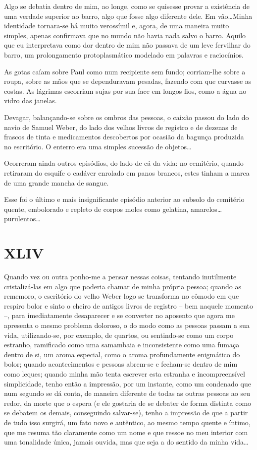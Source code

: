 Algo se debatia dentro de mim, ao longe, como se quisesse provar a existência de uma verdade superior ao barro, algo que fosse algo diferente dele. Em vão\dots Minha identidade tornara-se há muito verossímil e, agora, de uma maneira muito simples, apenas confirmava que no mundo não havia nada salvo o barro. Aquilo que eu interpretava como dor dentro de mim não passava de um leve fervilhar do barro, um prolongamento protoplasmático modelado em palavras e raciocínios.

As gotas caíam sobre Paul como num recipiente sem fundo; corriam-lhe sobre a roupa, sobre as mãos que se dependuravam pesadas, fazendo com que curvasse as costas. As lágrimas escorriam sujas por sua face em longos fios, como a água no vidro das janelas.

Devagar, balançando-se sobre os ombros das pessoas, o caixão passou do lado do navio de Samuel Weber, do lado dos velhos livros de registro e de dezenas de frascos de tinta e medicamentos descobertos por ocasião da bagunça produzida no escritório. O enterro era uma simples sucessão de objetos\dots

Ocorreram ainda outros episódios, do lado de cá da vida: no cemitério, quando retiraram do esquife o cadáver enrolado em panos brancos,  estes tinham a marca de uma grande mancha de sangue.

Esse foi o último e mais insignificante episódio anterior ao subsolo do cemitério quente, embolorado e repleto de corpos moles como gelatina, amarelos\dots purulentos\dots


\chapter*{\centering\Large{XLIV}}

Quando vez ou outra ponho-me a pensar nessas coisas, tentando inutilmente cristalizá-las em algo que poderia chamar de minha própria pessoa; quando as rememoro, o escritório do velho Weber logo se transforma no cômodo em que respiro bolor e sinto o cheiro de antigos livros de registro -- bem naquele momento --, para imediatamente desaparecer e se converter no aposento que agora me apresenta o mesmo problema doloroso, o do modo como as pessoas passam a sua vida, utilizando-se, por exemplo, de quartos, ou sentindo-se como um corpo estranho, ramificado como uma samambaia e inconsistente como uma fumaça dentro de si, um aroma especial, como o aroma profundamente enigmático do bolor; quando acontecimentos e pessoas abrem-se e fecham-se dentro de mim como leques; quando minha mão tenta escrever esta estranha e incompreensível simplicidade, tenho então a impressão, por um instante, como um condenado que num segundo se dá conta, de maneira diferente de todas as outras pessoas ao seu redor, da morte que o espera (e ele gostaria de se debater de forma distinta como se debatem os demais, conseguindo salvar-se), tenho a impressão de que a partir de tudo isso surgirá, um fato novo e autêntico, ao mesmo tempo quente e íntimo, que me resuma tão claramente como um nome e que ressoe no meu interior com uma tonalidade única, jamais ouvida, mas que seja a do sentido da minha vida\dots

